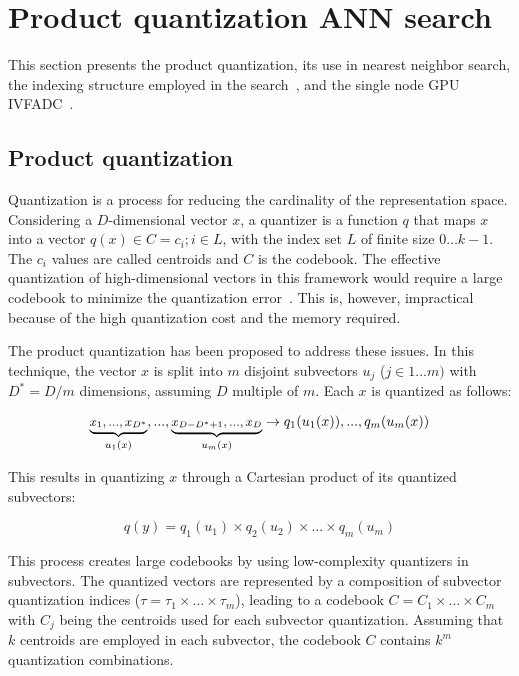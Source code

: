\chapter{Product quantization ANN search}
\label{sec:pqnns}

This section presents the product quantization, its use in nearest 
neighbor search, the indexing structure employed in the search~\cite{5432202},
and the single node GPU IVFADC~\cite{8733051}.

\section{Product quantization}

Quantization is a process for reducing the cardinality of the representation space. Considering 
a $D$-dimensional vector $x$, a quantizer is a function $q$ that maps $x$ into a 
vector $q(x) \in C = {c_i;i\in L}$, with the index set $L$ of finite size $0 \ldots k-1$. 
The $c_i$ values are called centroids and $C$ is the codebook. The effective quantization
of high-dimensional vectors in this framework would require a large codebook to 
minimize the quantization error~\cite{5432202}. This is, however, impractical because of the 
high quantization cost and the memory required.

The product quantization has been proposed to address these issues. In this technique, 
the vector $x$ is split into $m$ disjoint subvectors $u_j$ ($j \in 1...m)$ with $D^*=D/m$ 
dimensions, assuming $D$ multiple of $m$. Each $x$ is quantized as follows:

\begin{equation}
\small
\underbrace{x_1,...,x_{D^{*}}}_{u_1(x)},...,\underbrace{x_{D-D^{*}+1},...,x_D}_{u_m(x)} \rightarrow q_1(u_1(x)),...,q_m(u_m(x))
\end{equation} 

This results in quantizing $x$ through a Cartesian product of its quantized subvectors:

\begin{equation}\label{eq:subquant}
q(y) = q_1(u_1) \times q_2(u_2) \times ... \times q_m(u_m)
\end{equation}

This process creates large codebooks by using low-complexity quantizers 
in subvectors. The quantized vectors are represented by a composition of
subvector quantization indices ($\tau = \tau_1 \times \ldots \times \tau_m$), leading
to a codebook $C = C_1 \times \ldots \times C_m$ with $C_j$ being the centroids 
used for each subvector quantization. Assuming that $k$ centroids are employed in each
subvector, the codebook $C$ contains $k^m$ quantization combinations.

